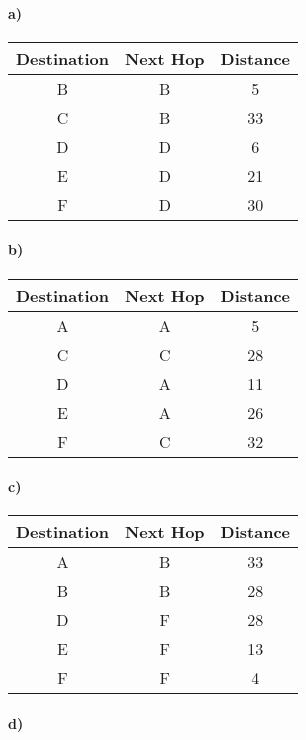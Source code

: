 \documentclass[12pt]{article}
\begin{document}
\paragraph{a)}

\begin{center}
    \begin{tabular}{c|c|c}
        Destination & Next Hop & Distance\\
        \hline
        B & B & 5\\
        C & B & 33\\
        D & D & 6\\
        E & D & 21\\
        F & D & 30
    \end{tabular}
\end{center}

\paragraph{b)}

\begin{center}
    \begin{tabular}{c|c|c}
        Destination & Next Hop & Distance\\
        \hline
        A & A & 5\\
        C & C & 28\\
        D & A & 11\\
        E & A & 26\\
        F & C & 32
    \end{tabular}
\end{center}

\paragraph{c)}

\begin{center}
    \begin{tabular}{c|c|c}
        Destination & Next Hop & Distance\\
        \hline
        A & B & 33\\
        B & B & 28\\
        D & F & 28\\
        E & F & 13\\
        F & F & 4
    \end{tabular}
\end{center}

\paragraph{d)}
\end{document}
